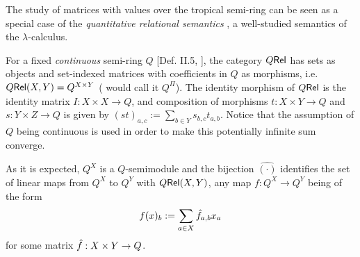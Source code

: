 
The study of matrices with values over the tropical semi-ring can be seen as a special case of the
\emph{quantitative relational semantics} \cite{Manzo2013}, a well-studied semantics of the $\lambda$-calculus. 

For a fixed \emph{continuous} semi-ring $Q$ [Def. II.5, \cite{Manzo2013}], the category $Q \mathsf{Rel}$ has sets as objects and set-indexed matrices with coefficients in $Q$ as morphisms, i.e.~$Q \mathsf{Rel}(X,Y)=Q^{X\times Y}$ (\cite{Manzo2013} would call it $Q^\Pi$).
The identity morphism of $Q \mathsf{Rel}$ is the identity matrix $I:X\times X\to Q$,
 and composition of morphisms $t:X\times Y\to Q$ and $s:Y\times Z\to Q$ is given by 
$(st)_{a,c}:=\sum\limits_{b\in Y} s_{b,c}t_{a,b}$.
Notice that the assumption of $Q$ being continuous 
 is used in order to make this potentially infinite sum converge.
 
 As it is expected, $Q^X$ is a $Q$-semimodule and the bijection $\hat{(\cdot)}$ identifies the set of linear maps from $Q^X$ to $Q^Y$ with 
 ${Q \mathsf{Rel}}(X,Y)$, any map $f:Q^{X}\to Q^{Y}$ being of the form
   \begin{equation}
  f(x)_b:=\sum\limits_{a\in X} \hat{f}_{a,b}x_a
 \end{equation}
 for some matrix $\hat{f}:X\times Y\to Q$.
 
